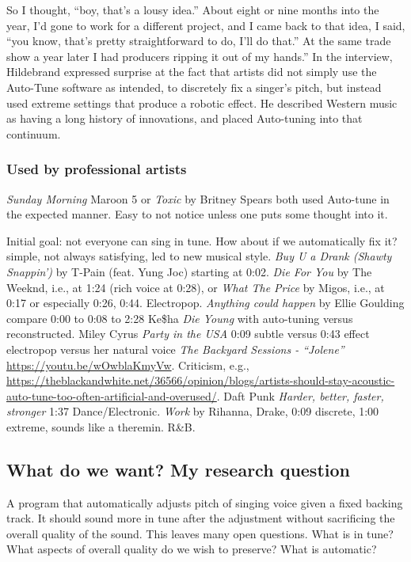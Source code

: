 So I thought, ``boy, that's a lousy idea.'' About eight or nine months into the year, I'd gone to work for a different project, and I came back to that idea, I said, ``you know, that's pretty straightforward to do, I'll do that.'' At the same trade show a year later I had producers ripping it out of my hands.'' In the interview, Hildebrand expressed surprise at the fact that artists did not simply use the Auto-Tune software as intended, to discretely fix a singer's pitch, but instead used extreme settings that produce a robotic effect. He described Western music as having a long history of innovations, and placed Auto-tuning into that continuum. 

\subsubsection{Used by professional artists}
\textit{Sunday Morning} Maroon 5 or \textit{Toxic} by Britney Spears both used Auto-tune in the expected manner. Easy to not notice unless one puts some thought into it. 

Initial goal: not everyone can sing in tune. How about if we automatically fix it? simple, not always satisfying, led to new musical style. \textit{Buy U a Drank (Shawty Snappin')} by T-Pain (feat. Yung Joc) starting at 0:02. \textit{Die For You} by The Weeknd, i.e., at 1:24 (rich voice at 0:28), or \textit{What The Price} by Migos, i.e., at 0:17 or especially 0:26, 0:44. Electropop. \textit{Anything could happen} by Ellie Goulding compare 0:00 to 0:08 to 2:28 Ke\$ha \textit{Die Young} with auto-tuning versus reconstructed. Miley Cyrus \textit{Party in the USA} 0:09 subtle versus 0:43 effect electropop versus her natural voice \textit{The Backyard Sessions - ``Jolene''} \url{https://youtu.be/wOwblaKmyVw}. Criticism, e.g., \url{https://theblackandwhite.net/36566/opinion/blogs/artists-should-stay-acoustic-auto-tune-too-often-artificial-and-overused/}. Daft Punk \textit{Harder, better, faster, stronger} 1:37 Dance/Electronic. \textit{Work} by Rihanna, Drake, 0:09 discrete, 1:00 extreme, sounds like a theremin. R\&B. 

\subsection{What do we want? My research question} A program that automatically adjusts pitch of singing voice given a fixed backing track. It should sound more in tune after the adjustment without sacrificing the overall quality of the sound. This leaves many open questions. What is in tune? What aspects of overall quality do we wish to preserve? What is automatic?

